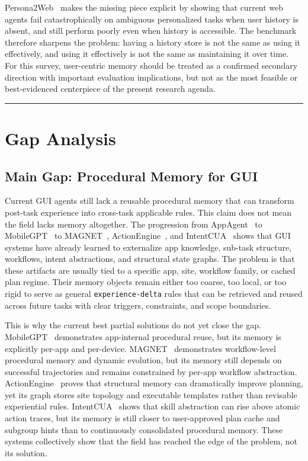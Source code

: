 \documentclass{article}
\begin{document}
Persona2Web~\parencite{kim2026persona2web} makes the missing piece explicit by
showing that current web agents fail catastrophically on ambiguous
personalized tasks when user history is absent, and still perform poorly
even when history is accessible. The benchmark therefore sharpens the
problem: having a history store is not the same as using it effectively,
and using it effectively is not the same as maintaining it over time.
For this survey, user-centric memory should be treated as a confirmed
secondary direction with important evaluation implications, but not as
the most feasible or best-evidenced centerpiece of the present research
agenda.

\begin{center}\rule{0.5\linewidth}{0.5pt}\end{center}

\section{Gap Analysis}\label{6-gap-analysis}

\subsection{Main Gap: Procedural Memory for
GUI}\label{61-main-gap-procedural-memory-for-gui}

Current GUI agents still lack a reusable procedural memory that can
transform post-task experience into cross-task applicable rules. This
claim does not mean the field lacks memory altogether. The progression
from AppAgent~\parencite{zhang2023appagent} to
MobileGPT~\parencite{lee2024mobilegpt} to
MAGNET~\parencite{sun2026magnet},
ActionEngine~\parencite{zhong2026actionengine}, and
IntentCUA~\parencite{lee2026intentcua} shows that GUI systems have
already learned to externalize app knowledge, sub-task structure,
workflows, intent abstractions, and structural state graphs. The
problem is that these artifacts are usually tied to a specific app,
site, workflow family, or cached plan regime. Their memory objects
remain either too coarse, too local, or too rigid to serve as general
\texttt{experience-delta} rules that can be retrieved and reused across
future tasks with clear triggers, constraints, and scope boundaries.

This is why the current best partial solutions do not yet close the gap.
MobileGPT~\parencite{lee2024mobilegpt} demonstrates app-internal
procedural reuse, but its memory is explicitly per-app and per-device.
MAGNET~\parencite{sun2026magnet} demonstrates workflow-level procedural
memory and dynamic evolution, but its memory still depends on
successful trajectories and remains constrained by per-app workflow
abstraction. ActionEngine~\parencite{zhong2026actionengine} proves that
structural memory can dramatically improve planning, yet its graph
stores site topology and executable templates rather than revisable
experiential rules. IntentCUA~\parencite{lee2026intentcua} shows that
skill abstraction can rise above atomic action traces, but its memory
is still closer to user-approved plan cache and subgroup hints than to
continuously consolidated procedural memory. These systems collectively
show that the field has reached the edge of the problem, not its
solution.
\end{document}
